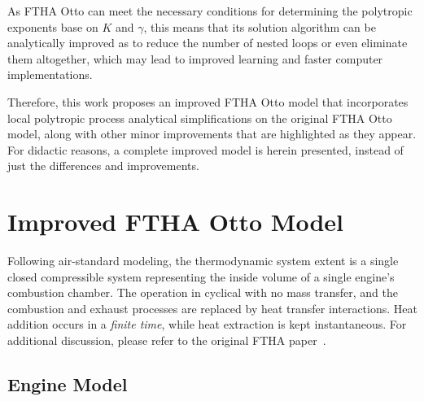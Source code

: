     As FTHA Otto can meet the necessary conditions for determining the polytropic exponents base on $K$ and $\gamma$, this means
    that its solution algorithm can be analytically improved as to reduce the number of nested  loops  or  even  eliminate  them
    altogether, which may lead to improved learning and faster computer implementations.

    Therefore, this  work  proposes  an  improved  FTHA  Otto  model  that  incorporates  local  polytropic  process  analytical
    simplifications on the original FTHA Otto model, along with other minor improvements that are highlighted  as  they  appear.
    For didactic reasons, a complete improved model is herein presented, instead of just the differences and improvements.



\section{Improved FTHA Otto Model}

    Following air-standard modeling, the thermodynamic system extent is a single closed  compressible  system  representing  the
    inside volume of a single engine's combustion chamber. The operation in cyclical with no mass transfer, and  the  combustion
    and exhaust processes are replaced by heat transfer interactions. Heat addition occurs in a \emph{finite time},  while  heat
    extraction   is   kept   instantaneous.   For   additional   discussion,    please    refer    to    the    original    FTHA
    paper~\cite{2017-NaaktgeborenC-IntJMechEngEduc}.

    \subsection{Engine Model}

